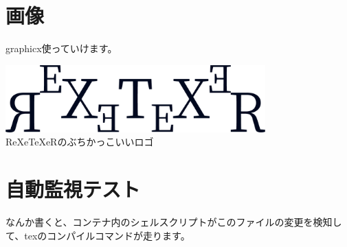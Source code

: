 \documentclass[a4paper]{article} %
\begin{document}
  \section{画像}
  graphicx使っていけます。
  \begin{center}
    \includegraphics[width=10cm]{img/logo.png} \\
    ReXeTeXeRのぶちかっこいいロゴ
  \end{center}

  \section{自動監視テスト}
  なんか書くと、コンテナ内のシェルスクリプトがこのファイルの変更を検知して、texのコンパイルコマンドが走ります。

  
  
\end{document}
